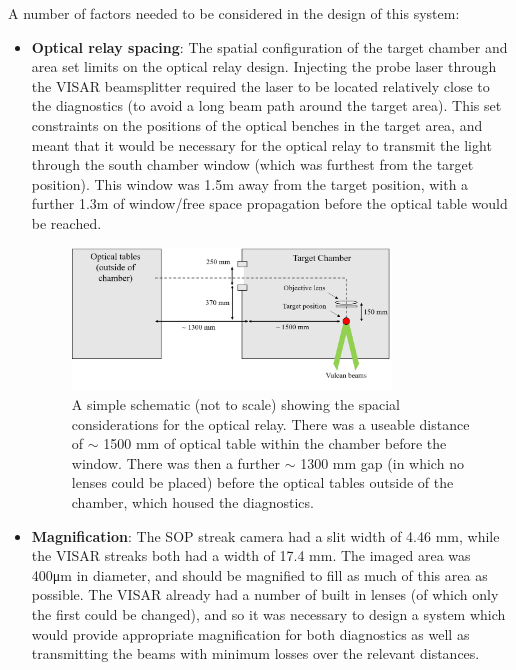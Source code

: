 A number of factors needed to be considered in the design of this system:

\begin{itemize}
    \item \textbf{Optical relay spacing}: The spatial configuration of the target chamber and area set limits on the optical relay design. Injecting the probe laser through the VISAR beamsplitter required the laser to be located relatively close to the diagnostics (to avoid a long beam path around the target area). This set constraints on the positions of the optical benches in the target area, and meant that it would be necessary for the optical relay to transmit the light through the south chamber window (which was furthest from the target position). This window was 1.5m away from the target position, with a further 1.3m of window/free space propagation before the optical table would be reached.
    
  \begin{figure}
  \centering
\includegraphics[width=0.8\textwidth]{figures/Experiment/Experiment Spacing.png}%
\caption{\label{fig:Experiment} A simple schematic (not to scale) showing the spacial considerations for the optical relay. There was a useable distance of $\sim$ 1500 mm of optical table within the chamber before the window. There was then a further $\sim$ 1300 mm gap (in which no lenses could be placed) before the optical tables outside of the chamber, which housed the diagnostics. }
\end{figure}  
    
    \item \textbf{Magnification}: The SOP streak camera had a slit width of 4.46 \unit{\milli\meter}, while the VISAR streaks both had a width of 17.4 \unit{\milli\meter}. The imaged area was 400\unit{\micro\meter} in diameter, and should be magnified to fill as much of this area as possible. The VISAR already had a number of built in lenses (of which only the first could be changed), and so it was necessary to design a system which would provide appropriate magnification for both diagnostics as well as transmitting the beams with minimum losses over the relevant distances.
    

\end{itemize}
